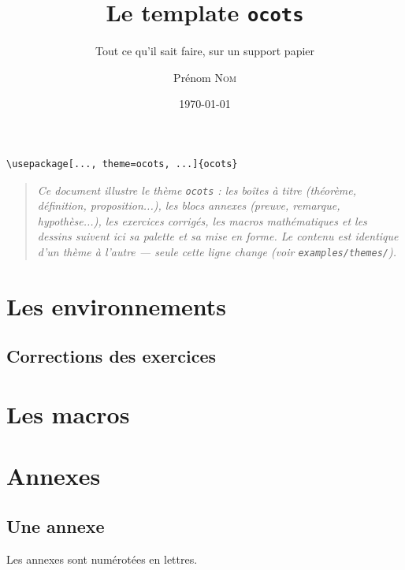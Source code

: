 \documentclass[11pt,twoside]{ocots-book}
\title{Le template \texttt{ocots}}
\subtitle{Tout ce qu'il sait faire, sur un support papier}
\author{Prénom \textsc{Nom}}
\date{\today}
\begin{document}
\dominitoc%

\frontmatter%
\maketitle

\begin{lstlisting}
\usepackage[..., theme=ocots, ...]{ocots}
\end{lstlisting}
\begin{quote}\itshape
Ce document illustre le th\`eme \texttt{ocots} : les bo\^ites \`a titre
(th\'eor\`eme, d\'efinition, proposition...), les blocs annexes (preuve,
remarque, hypoth\`ese...), les exercices corrig\'es, les macros
math\'ematiques et les dessins suivent ici sa palette et sa mise en forme.
Le contenu est identique d'un th\`eme \`a l'autre --- seule cette ligne
change (voir \texttt{examples/themes/}).
\end{quote}

\tableofcontents

\mainmatter%

\part{Les environnements}%
\label{part:env}

\ocotscollectsolutions%





\chapter{Corrections des exercices}%
\label{chap:solutions}
\ocotsprintsolutions%

\part{Les macros}%
\label{part:macros}




\part{Annexes}%
\label{part:appendix}

\begin{appendix}
    \chapter{Une annexe}%
    \label{chap:appendix}
    \minitoc%

    Les annexes sont numérotées en lettres.
\end{appendix}

\backmatter%
\printindex%
\end{document}

